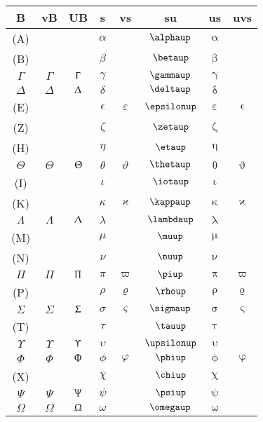 \documentclass{article}
\begin{document}
\begin{tabular}{cccccccc}
	B 			&vB				&UB				&s			&vs				&su				& us			& uvs				\\\hline
	(A)		&				&				&$\alpha$	&				&$\alphaup$		&$\upalpha$		&					\\
	(B)		&				&				&$\beta$	&				&$\betaup$		&$\upbeta$		&					\\
	$\Gamma$	&$\varGamma$	&$\Upgamma$		&$\gamma$	&				&$\gammaup$		&$\upgamma$		&					\\
	$\Delta$	&$\varDelta$	&$\Updelta$		&$\delta$	&				&$\deltaup$		&$\updelta$		&					\\
	(E)		&				&				&$\epsilon$	&$\varepsilon$	&$\epsilonup$	&$\upepsilon$	&$\upvarepsilon$	\\
	(Z)		&				&				&$\zeta$	&				&$\zetaup$		&$\upzeta$		&					\\
	(H)		&				&				&$\eta$		&				&$\etaup$		&$\upeta$		&					\\
	$\Theta$	&$\varTheta$	&$\Uptheta$		&$\theta$	&$\vartheta$	&$\thetaup$		&$\uptheta$		&$\upvartheta$		\\
	(I)		&				&				&$\iota$	&				&$\iotaup$		&$\upiota$		&					\\
	(K)		&				&				&$\kappa$	&$\varkappa$	&$\kappaup$		&$\upkappa$		&$\upvarkappa$		\\
	$\Lambda$	&$\varLambda$	&$\Uplambda$	&$\lambda$	&				&$\lambdaup$	&$\uplambda$	&					\\
	(M)		&				&				&$\mu$		&				&$\muup$		&$\upmu$		&					\\
	(N)		&				&				&$\nu$		&				&$\nuup$		&$\upnu$		&					\\
	$\Pi$		&$\varPi$		&$\Uppi$		&$\pi$		&$\varpi$		&$\piup$		&$\uppi$		&$\upvarpi$			\\
	(P)		&				&				&$\rho$		&$\varrho$		&$\rhoup$		&$\uprho$		&$\upvarrho$		\\
	$\Sigma$	&$\varSigma$	&$\Upsigma$		&$\sigma$	&$\varsigma$	&$\sigmaup$		&$\upsigma$		&$\upvarsigma$		\\
	(T)		&				&				&$\tau$		&				&$\tauup$		&$\uptau$		&					\\
	$\Upsilon$	&$\varUpsilon$	&$\Upupsilon$	&$\upsilon$	&				&$\upsilonup$	&$\upupsilon$	&					\\
	$\Phi$		&$\varPhi$		&$\Upphi$		&$\phi$		&$\varphi$		&$\phiup$		&$\upphi$		&$\upvarphi$		\\
	(X)		&				&				&$\chi$		&				&$\chiup$		&$\upchi$		&					\\
	$\Psi$		&$\varPsi$		&$\Uppsi$		&$\psi$		&				&$\psiup$		&$\uppsi$		&					\\
	$\Omega$	&$\varOmega$	&$\Upomega$		&$\omega$	&				&$\omegaup$		&$\upomega$		&					\\
\end{tabular}
\end{document}
